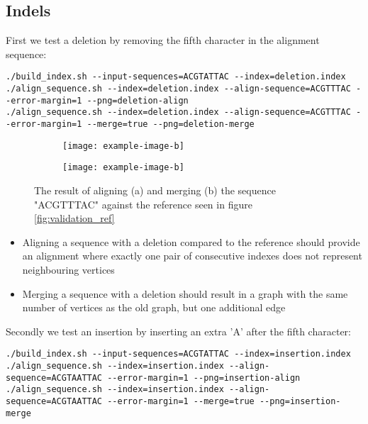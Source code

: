 \documentclass[thesis.tex]{subfiles}
\begin{document}
\subsection*{Indels}
First we test a deletion by removing the fifth character in the alignment sequence:\\
\par\noindent
\texttt{./build\_index.sh -{}-input-sequences=ACGTATTAC -{}-index=deletion.index}\\
\texttt{./align\_sequence.sh -{}-index=deletion.index -{}-align-sequence=ACGTTTAC -{}-error-margin=1 -{}-png=deletion-align}\\
\texttt{./align\_sequence.sh -{}-index=deletion.index -{}-align-sequence=ACGTTTAC -{}-error-margin=1 -{}-merge=true -{}-png=deletion-merge}\\
\begin{figure}[!h]
  \begin{subfigure}[t]{\textwidth}
    \texttt{[image: example-image-b]}
    \subcaption{}
  \end{subfigure}
  \begin{subfigure}[t]{\textwidth}
    \texttt{[image: example-image-b]}
    \subcaption{}
  \end{subfigure} 
  \caption{The result of aligning (a) and merging (b) the sequence "ACGTTTAC" against the reference seen in figure \ref{fig:validation_ref}}
  \label{fig:validation_deletion}
\end{figure}
\begin{itemize}
  \item Aligning a sequence with a deletion compared to the reference should provide an alignment where exactly one pair of consecutive indexes does not represent neighbouring vertices
  \item Merging a sequence with a deletion should result in a graph with the same number of vertices as the old graph, but one additional edge
\end{itemize}
Secondly we test an insertion by inserting an extra 'A' after the fifth character:\\
\par\noindent
\texttt{./build\_index.sh -{}-input-sequences=ACGTATTAC -{}-index=insertion.index}\\
\texttt{./align\_sequence.sh -{}-index=insertion.index -{}-align-sequence=ACGTAATTAC -{}-error-margin=1 -{}-png=insertion-align}\\
\texttt{./align\_sequence.sh -{}-index=insertion.index -{}-align-sequence=ACGTAATTAC -{}-error-margin=1 -{}-merge=true -{}-png=insertion-merge}\\
\end{document}
